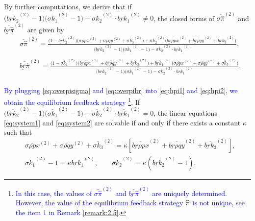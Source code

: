 \documentclass[11pt]{article}
\numberwithin{equation}{section}
\newcommand{\blue}[1]{\textcolor{blue}{#1}}
\begin{document}
	By further computations, we derive that if \(\big(\overline{\underline{br}k_2}^{(2)}-1\big)\big(\overline{\sigma k_1}^{(2)}-1\big)-\overline{\sigma k_2}^{(2)}\cdot\overline{\underline{br}k_1}^{(2)} \neq 0\), the closed forms of \(	\overline{\sigma\widehat{\pi}}^{(2)}\) and \(	\overline{\underline{br}\widehat{\pi}}^{(2)}\) are given by
		\begin{align}
		&\overline{\sigma\widehat{\pi}}^{(2)} =\frac{\big(1-\overline{\underline{br}k_2}^{(2)}\big)\big(\overline{\sigma\rho px}^{(2)}+\overline{\sigma\rho qy}^{(2)}+\overline{\sigma k_3}^{(2)}\big)+\overline{\sigma k_2}^{(2)}\big(\overline{\underline{br}\rho px}^{(2)}+\overline{\underline{br}\rho qy}^{(2)}+\overline{\underline{br} k_3}^{(2)}\big)}{\big(\overline{\underline{br}k_2}^{(2)}-1\big)\big(\overline{\sigma k_1}^{(2)}-1\big)-\overline{\sigma k_2}^{(2)}\cdot\overline{\underline{br}k_1}^{(2)}},\\
        \label{eq:overpisigma} \\
&\overline{\underline{br}\widehat{\pi}}^{(2)}=\frac{\big(1-\overline{\sigma k_1}^{(2)}\big)\big(\overline{\underline{br} \rho px}^{(2)}+\overline{\underline{br}\rho qy}^{(2)}+\overline{\underline{br} k_3}^{(2)}\big)+\overline{\underline{br}k_1}^{(2)}\big(\overline{\sigma\rho px}^{(2)}+\overline{\sigma\rho qy}^{(2)}+\overline{\sigma k_3}^{(2)}\big)}{\big(\overline{\underline{br}k_2}^{(2)}-1\big)\big(\overline{\sigma k_1}^{(2)}-1\big)-\overline{\sigma k_2}^{(2)}\cdot\overline{\underline{br}k_1}^{(2)}}.\\ \label{eq:overpibr}
	\end{align}

\blue{
	By plugging \eqref{eq:overpisigma} and \eqref{eq:overpibr} into \eqref{eq:hpi1} and \eqref{eq:hpi2}, we obtain the equilibrium feedback strategy \footnote{\blue{In this case, the values of $\overline{\sigma\widehat{\pi}}^{(2)}$ and $\overline{\underline{br}\widehat{\pi}}^{(2)}$ are uniquely determined. However, the value of the equilibrium feedback strategy $\widehat{\bf{\pi}}$ is not unique, see the item 1 in Remark \ref{remark:2.5}}. }.
}If \(\big(\overline{\underline{br}k_2}^{(2)}-1\big)\big(\overline{\sigma k_1}^{(2)}-1\big)-\overline{\sigma k_2}^{(2)}\cdot\overline{\underline{br}k_1}^{(2)} = 0\), the linear equations \eqref{eq:system1} and \eqref{eq:system2} are solvable if and only if there exists a constant \(\kappa\) such that
	\begin{align}
		&\overline{\sigma\rho px}^{(2)}+\overline{\sigma \rho qy}^{(2)}+\overline{\sigma k_3}^{(2)}=\kappa\left[\overline{\underline{br} \rho px}^{(2)}+\overline{\underline{br} \rho qy}^{(2)}+\overline{\underline{br}k_3}^{(2)}\right],\label{eq:kappa1}\\
		&\overline{\sigma k_1}^{(2)}-1=\kappa\overline{\underline{br} k_1}^{(2)},\quad\quad
		\overline{\sigma k_2}^{(2)}=\kappa\left(\overline{\underline{br} k_2}^{(2)}-1\right). \label{eq:kappa2}
	\end{align}
	
\end{document}
